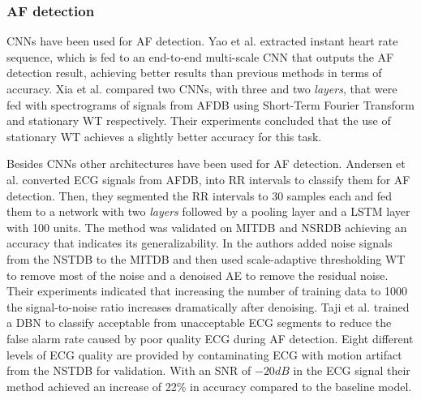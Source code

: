 \documentclass[journal]{IEEEtran}
\begin{document}
\subsubsection{AF detection}
CNNs have been used for AF detection.
Yao et al.\cite{yao2017atrial} extracted instant heart rate sequence, which is fed to an end-to-end multi-scale CNN that outputs the AF detection result, achieving better results than previous methods in terms of accuracy.
Xia et al.\cite{xia2018detecting} compared two CNNs, with three and two \textit{layers}, that were fed with spectrograms of signals from AFDB using Short-Term Fourier Transform and stationary WT respectively.
Their experiments concluded that the use of stationary WT achieves a slightly better accuracy for this task.

Besides CNNs other architectures have been used for AF detection.
Andersen et al.\cite{andersen2018deep} converted ECG signals from AFDB, into RR intervals to classify them for AF detection.
Then, they segmented the RR intervals to 30 samples each and fed them to a network with two \textit{layers} followed by a pooling layer and a LSTM layer with 100 units.
The method was validated on MITDB and NSRDB achieving an accuracy that indicates its generalizability.
In\cite{xiong2015denoising} the authors added noise signals from the NSTDB to the MITDB and then used scale-adaptive thresholding WT to remove most of the noise and a denoised AE to remove the residual noise.
Their experiments indicated that increasing the number of training data to 1000 the signal-to-noise ratio increases dramatically after denoising.
Taji et al.\cite{taji2017false} trained a DBN to classify acceptable from unacceptable ECG segments to reduce the false alarm rate caused by poor quality ECG during AF detection.
Eight different levels of ECG quality are provided by contaminating ECG with motion artifact from the NSTDB for validation.
With an SNR of $-20dB$ in the ECG signal their method achieved an increase of 22\% in accuracy compared to the baseline model.
\end{document}
